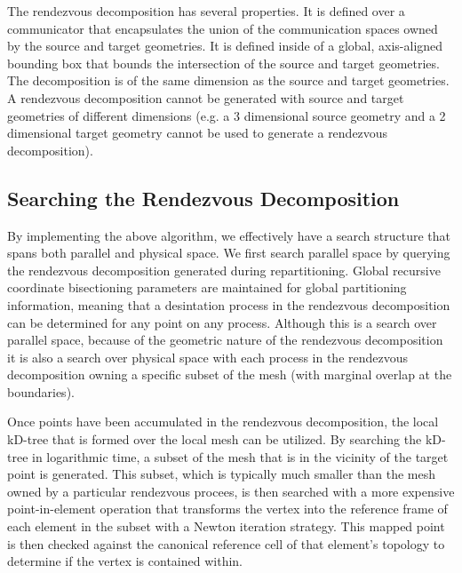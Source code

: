\documentclass[letterpaper,12pt]{article}
\begin{document}
The rendezvous decomposition has several properties. It is defined
over a communicator that encapsulates the union of the communication
spaces owned by the source and target geometries. It is defined inside
of a global, axis-aligned bounding box that bounds the intersection of
the source and target geometries. The decomposition is of the same
dimension as the source and target geometries. A rendezvous
decomposition cannot be generated with source and target geometries of
different dimensions (e.g. a 3 dimensional source geometry and a 2
dimensional target geometry cannot be used to generate a rendezvous
decomposition).

\subsection{Searching the Rendezvous Decomposition}
\label{subsec:rendezvous_search}
By implementing the above algorithm, we effectively have a search
structure that spans both parallel and physical space. We first search
parallel space by querying the rendezvous decomposition generated
during repartitioning. Global recursive coordinate bisectioning
parameters are maintained for global partitioning information, meaning
that a desintation process in the rendezvous decomposition can be
determined for any point on any process. Although this is a search
over parallel space, because of the geometric nature of the rendezvous
decomposition it is also a search over physical space with each
process in the rendezvous decomposition owning a specific subset of
the mesh (with marginal overlap at the boundaries).
 
Once points have been accumulated in the rendezvous decomposition, the
local kD-tree that is formed over the local mesh can be utilized. By
searching the kD-tree in logarithmic time, a subset of the mesh that
is in the vicinity of the target point is generated. This subset,
which is typically much smaller than the mesh owned by a particular
rendezvous procees, is then searched with a more expensive
point-in-element operation that transforms the vertex into the
reference frame of each element in the subset with a Newton iteration
strategy. This mapped point is then checked against the canonical
reference cell of that element's topology to determine if the vertex
is contained within.

\clearpage

\end{document}
